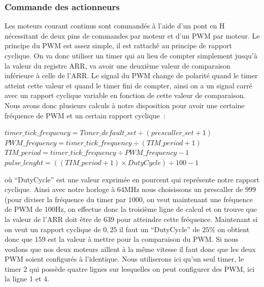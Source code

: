 \documentclass{article}
\begin{document}
\subsubsection{Commande des actionneurs}

Les moteurs courant continus sont commandés à l'aide d'un pont en H nécessitant de deux pins de commandes par moteur et d'un PWM par moteur. Le principe du PWM est assez simple, il est rattaché au principe de rapport cyclique. On va donc utiliser un timer qui au lieu de compter simplement jusqu'à la valeur du registre ARR, va avoir une deuxième valeur de comparaison inférieure à celle de l'ARR. Le signal du PWM change de polarité quand le timer atteint cette valeur et quand le timer fini de compter, ainsi on a un signal carré avec un rapport cyclique variable en fonction de cette valeur de comparaison. \\

Nous avons donc plusieurs calculs à notre disposition pour avoir une certaine fréquence de PWM et un certain rapport cyclique~: \\

\begin{center}
  $timer\_tick\_frequency = Timer\_default\_set \div ( prescaller\_set + 1 )$ \\
  $PWM\_frequency = timer\_tick\_frequency \div ( TIM\_period + 1 ) $ \\
  $TIM\_period = timer\_tick\_frequency \div PWM\_frequency - 1 $ \\
  $pulse\_lenght = ((TIM\_period + 1) \times DutyCycle) \div 100 - 1$ \\
\end{center} 

où ``DutyCycle'' est une valeur exprimée en pourcent qui représente notre rapport cyclique. Ainsi avec notre horloge à 64MHz nous choisissons un prescaller de $999$ (pour diviser la fréquence du timer par $1000$, on veut maintenant une fréquence de PWM de 100Hz, on effectue donc la troisième ligne de calcul et on trouve que la valeur de l'ARR doit être de $639$ pour atteindre cette fréquence. Maintenant si on veut un rapport cyclique de $0,25$ il faut un ``DutyCycle'' de $25\%$ on obtient donc que $159$ est la valeur à mettre pour la comparaison du PWM. Si nous voulons que nos deux moteurs aillent à la même vitesse il faut donc que les deux PWM soient configurés à l'identique. Nous utiliserons ici qu'un seul timer, le timer 2 qui possède quatre lignes sur lesquelles on peut configurer des PWM, ici la ligne 1 et 4. \\
\end{document}
